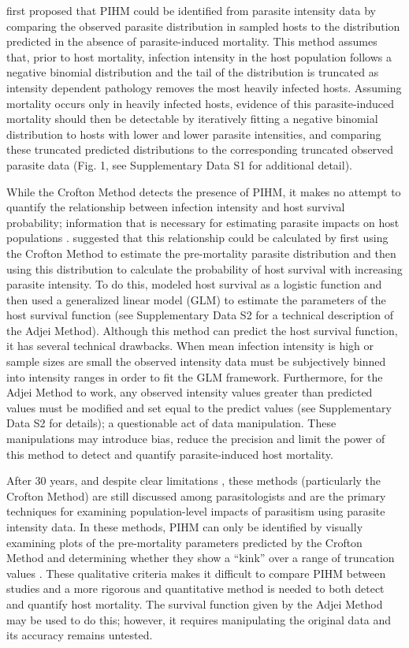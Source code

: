 \documentclass[12pt, a4paper]{article}
\begin{document}
\cite{Crofton1971a} first proposed that PIHM could be identified from parasite intensity data by comparing the
observed parasite distribution in sampled hosts to the distribution
predicted in the absence of parasite-induced mortality. This method
assumes that, prior to host mortality, infection intensity in the host population follows a negative binomial distribution and the tail of the distribution is truncated as intensity dependent pathology removes the most heavily infected hosts. Assuming mortality occurs only in heavily infected hosts, evidence of this parasite-induced mortality should then be detectable by iteratively
fitting a negative binomial distribution to hosts with lower and lower parasite intensities, and comparing these truncated predicted distributions to the corresponding truncated observed parasite data (Fig. 1, see Supplementary Data S1 for additional detail).

While the Crofton Method detects the presence of PIHM, it makes no attempt to
quantify the relationship between infection intensity and host survival
probability; information that is necessary for estimating parasite impacts on host populations \citep{AndersonandMay1978,Tompkins2002}. \cite{Adjei1986}
suggested that this relationship could be calculated by first using the Crofton
Method to estimate the pre-mortality parasite distribution and then using this
distribution to calculate the probability of host survival with increasing
parasite intensity. To do this, \cite{Adjei1986} modeled host survival as a
logistic function and then used a generalized linear model (GLM) to estimate
the parameters of the host survival function (see Supplementary Data S2 for a technical
description of the Adjei Method).  Although this method can predict the host survival function, it has several technical drawbacks. When mean infection intensity is high or sample sizes
are small the observed intensity data must be subjectively binned into
intensity ranges in order to fit the GLM framework. Furthermore, for the Adjei
Method to work, any observed intensity values greater than predicted values
must be modified and set equal to the predict values (see Supplementary Data S2 for
details); a questionable act of data manipulation. These manipulations may introduce bias, reduce the precision and
limit the power of this method to detect and quantify parasite-induced host
mortality.

After 30 years, and despite clear limitations \citep{McCallum2000a}, these
methods (particularly the Crofton Method) are still discussed among
parasitologists and are the primary techniques for examining population-level
impacts of parasitism using parasite intensity data. In these methods, PIHM can only be identified by visually examining plots of the pre-mortality parameters predicted by the Crofton Method and determining whether they show a ``kink'' over a range of truncation values \citep[Fig. 1B;][]{Lester1984,Ferguson2011}. These qualitative criteria makes it difficult to compare PIHM between studies and a more rigorous and quantitative method is needed to both detect and quantify host mortality. The survival function given by the Adjei
Method may be used to do this; however, it requires manipulating the
original data and its accuracy remains untested.
\end{document}
